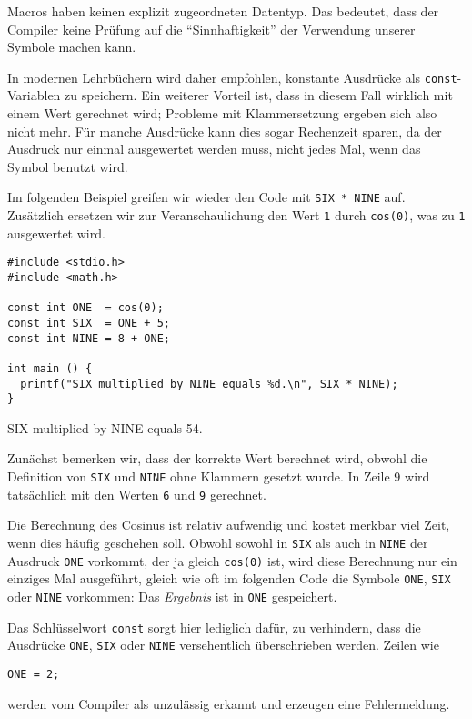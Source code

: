 \begin{hintbox}
Macros haben keinen explizit zugeordneten Datentyp. Das bedeutet, dass der Compiler keine Prüfung auf die \enquote{Sinnhaftigkeit} der Verwendung unserer Symbole machen kann. 

In modernen Lehrbüchern wird daher empfohlen, konstante Ausdrücke als \texttt{const}-Variablen zu speichern. Ein weiterer Vorteil ist, dass in diesem Fall wirklich mit einem Wert gerechnet wird; Probleme mit Klammersetzung ergeben sich also nicht mehr. Für manche Ausdrücke kann dies sogar Rechenzeit sparen, da der Ausdruck nur einmal ausgewertet werden muss, nicht jedes Mal, wenn das Symbol benutzt wird.

Im folgenden Beispiel greifen wir wieder den Code mit \texttt{SIX * NINE} auf. Zusätzlich ersetzen wir zur Veranschaulichung den Wert \texttt{1} durch \texttt{cos(0)}, was zu \texttt{1} ausgewertet wird.

\begin{codebox}
\begin{verbatim}
#include <stdio.h>
#include <math.h>

const int ONE  = cos(0);
const int SIX  = ONE + 5;
const int NINE = 8 + ONE;

int main () {
  printf("SIX multiplied by NINE equals %d.\n", SIX * NINE);
}
\end{verbatim}
\end{codebox}

\begin{cmdbox}
SIX multiplied by NINE equals 54.
\end{cmdbox}

Zunächst bemerken wir, dass der korrekte Wert berechnet wird, obwohl die Definition von \texttt{SIX} und \texttt{NINE} ohne Klammern gesetzt wurde. In Zeile 9 wird tatsächlich mit den Werten \texttt{6} und \texttt{9} gerechnet.

Die Berechnung des Cosinus ist relativ aufwendig und kostet merkbar viel Zeit, wenn dies häufig geschehen soll. Obwohl sowohl in \texttt{SIX} als auch in \texttt{NINE} der Ausdruck \texttt{ONE} vorkommt, der ja gleich \texttt{cos(0)} ist, wird diese Berechnung nur ein einziges Mal ausgeführt, gleich wie oft im folgenden Code die Symbole \texttt{ONE}, \texttt{SIX} oder \texttt{NINE} vorkommen: Das \emph{Ergebnis} ist in \texttt{ONE} gespeichert.

Das Schlüsselwort \texttt{const} sorgt hier lediglich dafür, zu verhindern, dass die Ausdrücke \texttt{ONE}, \texttt{SIX} oder \texttt{NINE} versehentlich überschrieben werden. Zeilen wie
\begin{center}
\texttt{ONE = 2;}
\end{center}
werden vom Compiler als unzulässig erkannt und erzeugen eine Fehlermeldung.
\end{hintbox}


